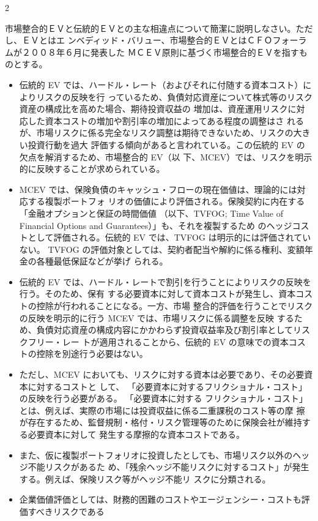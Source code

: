 2\documentclass[report,gutter=10mm,fore-edge=10mm,uplatex,dvipdfmx]{jlreq}
\begin{document}
市場整合的ＥＶと伝統的ＥＶとの主な相違点について簡潔に説明しなさい。ただし、ＥＶとはエ
ンベディッド・バリュー、市場整合的ＥＶとはＣＦＯフォーラムが２００８年６月に発表した
ＭＣＥＶ原則に基づく市場整合的ＥＶを指すものとする。
\answer{}
\begin{itemize}
\item[] 伝統的 EV では、ハードル・レート（およびそれに付随する資本コスト）によりリスクの反映を行
っているため、負債対応資産について株式等のリスク資産の構成比を高めた場合、期待投資収益の
増加は、資産運用リスクに対応した資本コストの増加や割引率の増加によってある程度の調整はさ
れるが、市場リスクに係る完全なリスク調整は期待できないため、リスクの大きい投資行動を過大
評価する傾向があると言われている。この伝統的 EV の欠点を解消するため、市場整合的 EV（以
下、MCEV）では、リスクを明示的に反映することが求められている。
\item[] MCEV では、保険負債のキャッシュ・フローの現在価値は、理論的には対応する複製ポートフォ
リオの価値により評価される。保険契約に内在する「金融オプションと保証の時間価値
（以下、TVFOG; Time Value of Financial Options and Guarantees）」も、それを複製するため
のヘッジコストとして評価される。伝統的 EV では、TVFOG は明示的には評価されていない。
TVFOG の評価対象としては、契約者配当や解約に係る権利、変額年金の各種最低保証などが挙げ
られる。
\item[] 伝統的 EV では、ハードル・レートで割引を行うことによりリスクの反映を行う。そのため、保有
する必要資本に対して資本コストが発生し、資本コストの控除が行われることになる。一方、市場
整合的評価を行うことでリスクの反映を明示的に行う MCEV では、市場リスクに係る調整を反映
するため、負債対応資産の構成内容にかかわらず投資収益率及び割引率としてリスクフリー・レー
トが適用されることから、伝統的 EV の意味での資本コストの控除を別途行う必要はない。
\item[] ただし、MCEV においても、リスクに対する資本は必要であり、その必要資本に対するコストと
して、
「必要資本に対するフリクショナル・コスト」の反映を行う必要がある。
「必要資本に対する
フリクショナル・コスト」とは、例えば、実際の市場には投資収益に係る二重課税のコスト等の摩
擦が存在するため、監督規制・格付・リスク管理等のために保険会社が維持する必要資本に対して
発生する摩擦的な資本コストである。
\item[] また、仮に複製ポートフォリオに投資したとしても、市場リスク以外のヘッジ不能リスクがあるた
め、「残余ヘッジ不能リスクに対するコスト」が発生する。例えば、保険リスク等がヘッジ不能リ
スクに分類される。
\item[] 企業価値評価としては、財務的困難のコストやエージェンシー・コストも評価すべきリスクである

\end{itemize}
\end{document}

